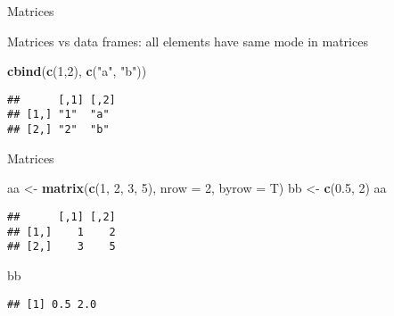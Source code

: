 \documentclass[ignorenonframetext,]{beamer}
\newenvironment{Shaded}{\begin{snugshade}}{\end{snugshade}}
\newcommand{\DataTypeTok}[1]{\textcolor[rgb]{0.13,0.29,0.53}{#1}}
\newcommand{\DecValTok}[1]{\textcolor[rgb]{0.00,0.00,0.81}{#1}}
\newcommand{\FloatTok}[1]{\textcolor[rgb]{0.00,0.00,0.81}{#1}}
\newcommand{\KeywordTok}[1]{\textcolor[rgb]{0.13,0.29,0.53}{\textbf{#1}}}
\newcommand{\NormalTok}[1]{#1}
\newcommand{\StringTok}[1]{\textcolor[rgb]{0.31,0.60,0.02}{#1}}
\begin{document}
\begin{frame}[fragile]{Matrices}
\protect\hypertarget{matrices}{}

Matrices vs data frames: all elements have same mode in matrices

\begin{Shaded}
\begin{Highlighting}[]
\KeywordTok{cbind}\NormalTok{(}\KeywordTok{c}\NormalTok{(}\DecValTok{1}\NormalTok{,}\DecValTok{2}\NormalTok{), }\KeywordTok{c}\NormalTok{(}\StringTok{"a"}\NormalTok{, }\StringTok{"b"}\NormalTok{))}
\end{Highlighting}
\end{Shaded}

\begin{verbatim}
##      [,1] [,2]
## [1,] "1"  "a" 
## [2,] "2"  "b"
\end{verbatim}

\end{frame}

\begin{frame}[fragile]{Matrices}
\protect\hypertarget{matrices-1}{}

\begin{Shaded}
\begin{Highlighting}[]
\NormalTok{aa <-}\StringTok{ }\KeywordTok{matrix}\NormalTok{(}\KeywordTok{c}\NormalTok{(}\DecValTok{1}\NormalTok{, }\DecValTok{2}\NormalTok{, }\DecValTok{3}\NormalTok{, }\DecValTok{5}\NormalTok{), }\DataTypeTok{nrow =} \DecValTok{2}\NormalTok{, }\DataTypeTok{byrow =}\NormalTok{ T)}
\NormalTok{bb <-}\StringTok{ }\KeywordTok{c}\NormalTok{(}\FloatTok{0.5}\NormalTok{, }\DecValTok{2}\NormalTok{)}
\NormalTok{aa}
\end{Highlighting}
\end{Shaded}

\begin{verbatim}
##      [,1] [,2]
## [1,]    1    2
## [2,]    3    5
\end{verbatim}

\begin{Shaded}
\begin{Highlighting}[]
\NormalTok{bb}
\end{Highlighting}
\end{Shaded}

\begin{verbatim}
## [1] 0.5 2.0
\end{verbatim}

\end{frame}
\end{document}
